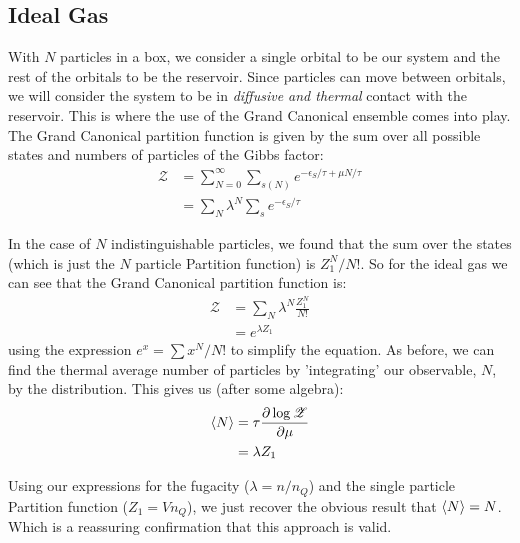\subsection{Ideal Gas}
With $N$ particles in a box, we consider a single orbital to be our system and the rest of the orbitals to be the reservoir. Since particles can move between orbitals, we will consider the system to be in \emph{diffusive and thermal} contact with the reservoir. This is where the use of the Grand Canonical ensemble comes into play. The Grand Canonical partition function is given by the sum over all possible states and numbers of particles of the Gibbs factor:
\begin{align}
\mathscr{Z} &= \sum_{N=0}^{\infty} \sum_{s(N)} e^{-\epsilon_{S}/\tau 
	+ \mu N/\tau}\\
            &= \sum_N \lambda^N \sum_s e^{-\epsilon_{S}/\tau}
\end{align}

In the case of $N$ indistinguishable particles, we found that the sum over the states (which is just the $N$ particle Partition function) is $Z_1^N/N!$. So for the ideal gas we can see that the Grand Canonical partition function is:
\begin{align}
\mathscr{Z} &= \sum_N \lambda^N \frac{Z_1^N}{N!} \\
	        &= e^{\lambda Z_1}
\end{align}
using the expression $e^x = \sum x^N/N!$ to simplify the equation. As before, we can find the thermal average number of particles by 'integrating' our observable, $N$, by the distribution. This gives us (after some algebra):
\begin{align}
\Braket{N} &= \tau \frac{\partial \log{\mathscr{Z}}}{\partial \mu}\\
	       &= \lambda Z_1
\label{eq:Nave}
\end{align}

Using our expressions for the fugacity ($\lambda = n/n_Q$) and the single particle Partition function ($Z_1 = V n_Q$), we just recover the obvious result that $\Braket{N} = N$. Which is a reassuring confirmation that this approach is valid.

